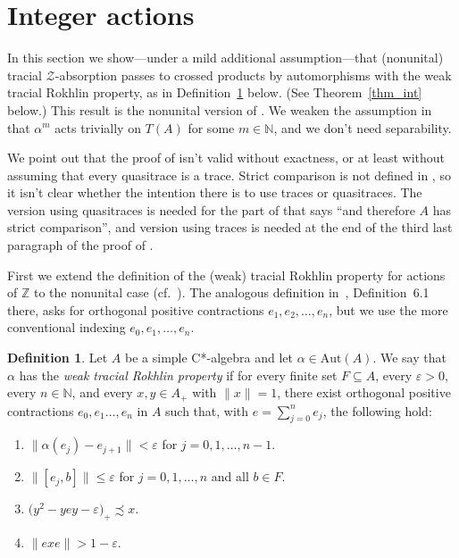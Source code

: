 \documentclass[11pt]{amsart}
\theoremstyle{plain}
\theoremstyle{definition}
\newtheorem{definition}[theorem]{Definition}
\theoremstyle{remark}
\numberwithin{equation}{section}
\begin{document}
\section{Integer actions}\label{sec_int}

\indent
In this section we show---under a mild additional assumption---that
(nonunital)
tracial $\mathcal{Z}$-absorption
passes to crossed products by automorphisms
with the weak tracial Rokhlin property,
as in Definition~\ref{defwtrpaut} below.
(See Theorem~\ref{thm_int} below.)
This result is the nonunital version
of \cite[Theorem 6.7]{HO13}.
We weaken
the assumption in \cite[Theorem 6.7]{HO13}
that $\alpha^{m}$ acts trivially on $T (A)$ for some
$m \in \mathbb{N}$,
and we don't need separability.

We point out that
the proof of \cite[Theorem 6.7]{HO13} isn't valid without exactness,
or at least without assuming that
every quasitrace is a trace.
Strict comparison is not defined in \cite{HO13},
so it isn't clear whether the intention there is
to use traces or quasitraces.
The version using quasitraces is needed
for the part of \cite[Theorem 3.3]{HO13}
that says ``and therefore $A$ has strict comparison'',
and version using traces is needed
at the end of the third last paragraph of
the proof of \cite[Lemma 6.6]{HO13}.

First we extend the definition of the (weak) tracial Rokhlin property
for actions of
$\mathbb{Z}$ to the nonunital case (cf.~\cite[Definition~1.1]{OP06}).
The analogous definition in~\cite{HO13}, Definition~6.1 there,
asks for orthogonal positive contractions
$e_{1}, e_{2}, \ldots, e_{n}$,
but we use the more conventional indexing
$e_{0}, e_{1}, \ldots, e_{n}$.

\begin{definition}\label{defwtrpaut}
Let $A$ be a simple C*-algebra and let $\alpha \in \mathrm{Aut} (A)$.
We say that $\alpha$ has the \emph{weak tracial Rokhlin property}
if for every finite set $F \subseteq A$, every $\varepsilon > 0$,
every $n \in \mathbb{N}$,
and every $x, y \in A_{+}$ with $\| x \| = 1$,
there exist orthogonal positive contractions
$e_{0}, e_{1} \ldots, e_{n}$ in $A$ such that,
with $e = \sum_{j = 0}^{n} e_{j}$, the following hold:
%
\begin{enumerate}
\item\label{defwtrpaut_it1}
$\| \alpha (e_{j}) - e_{j + 1} \| < \varepsilon$
for $j = 0, 1, \ldots, n - 1$.
\item\label{defwtrpaut_it2}
$\| [e_{j}, b] \| \leq \varepsilon$
for $j = 0, 1, \ldots, n$ and all $b \in F$.
\item\label{defwtrpaut_it3}
$\big( y^{2} - y e y - \varepsilon \big)_{+} \precsim x$.
\item\label{defwtrpaut_it4}
$\|e x e\| > 1 - \varepsilon$.
\end{enumerate}
%
\end{definition}
\end{document}
